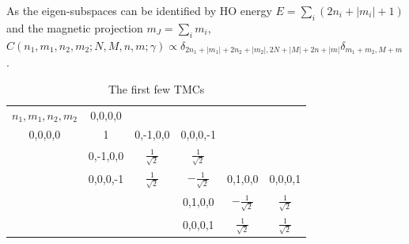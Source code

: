 \documentclass[a4paper,10pt]{article}
\begin{document}
As the eigen-subspaces can be identified by HO energy $E = \sum_i (2n_i + |m_i|+1)$ and the magnetic projection $m_J = \sum_i m_i$, $C(n_1,m_1,n_2,m_2;N,M,n,m;\gamma) \propto 
\delta_{2n_1+|m_1|+2n_2+|m_2|,2N+|M|+2n+|m|} \delta_{m_1+m_2,M+m}$.
 
% 
% 

\begin{table}
 \centering 
 \begin{tabular}{ c  c  c  c  c  c }
  \cline{1-2}
  \multicolumn{1}{|c|}{$n_1,m_1,n_2,m_2$} & \multicolumn{1}{c|}{0,0,0,0} &  &  &  &  \\ \cline{1-4} 
            \multicolumn{1}{|c|}{0,0,0,0} & \multicolumn{1}{c|}{1}    & \multicolumn{1}{c|}{0,-1,0,0}&\multicolumn{1}{c|}{0,0,0,-1}&        & \\ \cline{1-4}
           &\multicolumn{1}{|c|}{0,-1,0,0} &$\frac{1}{\sqrt{2}}$ &\multicolumn{1}{c|}{$\frac{1}{\sqrt{2}}$} &  &  \\ \cline{2-2} \cline{5-6} 
           &\multicolumn{1}{|c|}{0,0,0,-1} & $\frac{1}{\sqrt{2}}$ & \multicolumn{1}{c|}{$-\frac{1}{\sqrt{2}}$} & \multicolumn{1}{c|}{0,1,0,0} & \multicolumn{1}{c|}{0,0,0,1} \\ \cline{2-6}  
           &  &  & \multicolumn{1}{|c|}{0,1,0,0}   &  $-\frac{1}{\sqrt{2}}$ & \multicolumn{1}{c|}{$\frac{1}{\sqrt{2}}$} \\ \cline{4-4} 
           &  &  & \multicolumn{1}{|c|}{0,0,0,1}   &  $\frac{1}{\sqrt{2}}$  & \multicolumn{1}{c|}{$\frac{1}{\sqrt{2}}$} \\  
  \cline{4-6} 
 \end{tabular}
 \caption{The first few TMCs}
\end{table}
                               
\end{document}
